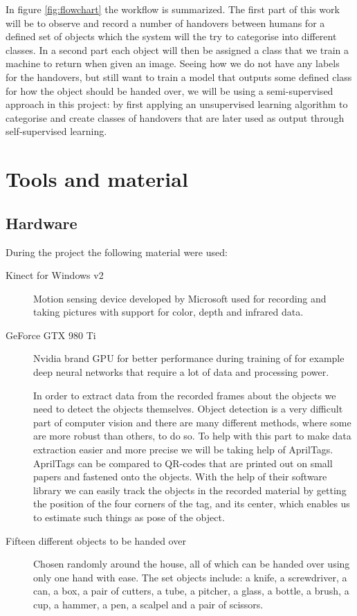 In figure \ref{fig:flowchart} the workflow is summarized. The first part of this work will be to observe and record a number of handovers between humans for a defined set of objects which the system will the try to categorise into different classes. In a second part each object will then be assigned a class that we train a machine to return when given an image. Seeing how we do not have any labels for the handovers, but still want to train a model that outputs some defined class for how the object should be handed over, we will be using a semi-supervised approach in this project: by first applying an unsupervised learning algorithm to categorise and create classes of handovers that are later used as output through self-supervised learning.


\section{Tools and material}

\subsection*{Hardware}

During the project the following material were used:

\begin{description}
	\item[Kinect for Windows v2] Motion sensing device developed by Microsoft used for recording and taking pictures with support for color, depth and infrared data.

	\item[GeForce GTX 980 Ti] Nvidia brand GPU for better performance during training of for example deep neural networks that require a lot of data and processing power.

	\item[\textcite{AprilTags}] In order to extract data from the recorded frames about the objects we need to detect the objects themselves. Object detection is a very difficult part of computer vision and there are many different methods, where some are more robust than others, to do so. To help with this part to make data extraction easier and more precise we will be taking help of AprilTags. AprilTags can be compared to QR-codes that are printed out on small papers and fastened onto the objects. With the help of their software library we can easily track the objects in the recorded material by getting the position of the four corners of the tag, and its center, which enables us to estimate such things as pose of the object.

	\item[Fifteen different objects to be handed over] Chosen randomly around the house, all of which can be handed over using only one hand with ease. The set objects include: a knife, a screwdriver, a can, a box, a pair of cutters, a tube, a pitcher, a glass, a bottle, a brush, a cup, a hammer, a pen, a scalpel and a pair of scissors.

\end{description}

